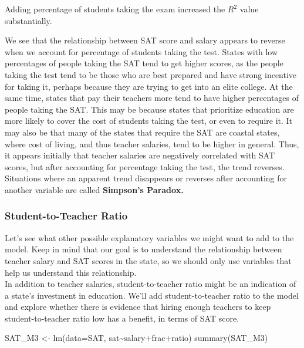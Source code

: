 \documentclass[
  letterpaper,
  DIV=11,
  numbers=noendperiod]{scrreprt}
\newenvironment{Shaded}{\begin{snugshade}}{\end{snugshade}}
\newcommand{\AttributeTok}[1]{\textcolor[rgb]{0.40,0.45,0.13}{#1}}
\newcommand{\FunctionTok}[1]{\textcolor[rgb]{0.28,0.35,0.67}{#1}}
\newcommand{\NormalTok}[1]{\textcolor[rgb]{0.00,0.23,0.31}{#1}}
\newcommand{\OtherTok}[1]{\textcolor[rgb]{0.00,0.23,0.31}{#1}}
\newcommand{\SpecialCharTok}[1]{\textcolor[rgb]{0.37,0.37,0.37}{#1}}
\begin{document}
Adding percentage of students taking the exam increased the \(R^2\)
value substantially.

We see that the relationship between SAT score and salary appears to
reverse when we account for percentage of students taking the test.
States with low percentages of people taking the SAT tend to get higher
scores, as the people taking the test tend to be those who are best
prepared and have strong incentive for taking it, perhaps because they
are trying to get into an elite college. At the same time, states that
pay their teachers more tend to have higher percentages of people taking
the SAT. This may be because states that prioritize education are more
likely to cover the cost of students taking the test, or even to require
it. It may also be that many of the states that require the SAT are
coastal states, where cost of living, and thus teacher salaries, tend to
be higher in general. Thus, it appears initially that teacher salaries
are negatively correlated with SAT scores, but after accounting for
percentage taking the test, the trend reverses. Situations where an
apparent trend disappears or reverses after accounting for another
variable are called \textbf{Simpson's Paradox.}

\subsubsection{Student-to-Teacher Ratio}\label{student-to-teacher-ratio}

Let's see what other possible explanatory variables we might want to add
to the model. Keep in mind that our goal is to understand the
relationship between teacher salary and SAT scores in the state, so we
should only use variables that help us understand this relationship.\\
In addition to teacher salaries, student-to-teacher ratio might be an
indication of a state's investment in education. We'll add
student-to-teacher ratio to the model and explore whether there is
evidence that hiring enough teachers to keep student-to-teacher ratio
low has a benefit, in terms of SAT score.

\begin{Shaded}
\begin{Highlighting}[]
\NormalTok{SAT\_M3 }\OtherTok{\textless{}{-}} \FunctionTok{lm}\NormalTok{(}\AttributeTok{data=}\NormalTok{SAT, sat}\SpecialCharTok{\textasciitilde{}}\NormalTok{salary}\SpecialCharTok{+}\NormalTok{frac}\SpecialCharTok{+}\NormalTok{ratio)}
\FunctionTok{summary}\NormalTok{(SAT\_M3)}
\end{Highlighting}
\end{Shaded}
\end{document}
